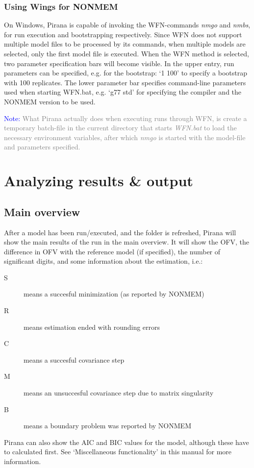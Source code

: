 {{\subsubsection*{Using Wings for NONMEM} 
On Windows, Pirana is
capable of invoking the WFN-commands \emph{nmgo} and \emph{nmbs}, for
run execution and bootstrapping respectively. Since
WFN does not support multiple model files to be processed by its
commands, when multiple models are selected, only the first model file
is executed. When the WFN method is selected, two parameter
specification bars will become visible. In the upper entry, run
parameters can be specified, e.g. for the bootstrap: `1 100' to
specify a bootstrap with 100 replicates. The lower parameter bar
specifies command-line parameters used when starting WFN.bat,
e.g. `g77 std' for specifying the compiler and the NONMEM version to
be used. 

\vspace{10pt}
\noindent\scriptsize{\textcolor{Blue}{Note:} \textcolor{Grey} {What Pirana actually does when executing runs through WFN, is create a temporary batch-file in the current directory that starts \emph{WFN.bat} to load the necessary environment variables, after which \emph{nmgo} is started with the model-file and parameters specified.}
  \normalsize

\clearpage
\section{Analyzing results \& output}

\subsection{Main overview}
After a model has been run/executed, and the folder is refreshed, Pirana will show the main results of the run in the main overview. It will show the OFV, the difference in OFV with the reference model (if specified), the number of significant digits, and some information about the estimation, i.e.:
\begin{description}
\item [S] means a succesful minimization (as reported by NONMEM) 
\item [R] means estimation ended with rounding errors
\item [C] means a succesful covariance step
\item [M] means an unsuccesful covariance step due to matrix singularity 
\item [B] means a boundary problem was reported by NONMEM
\end{description}
Pirana can also show the AIC and BIC values for the model, although these have to calculated first. See `Miscellaneous functionality' in this manual for more information.

}}}

